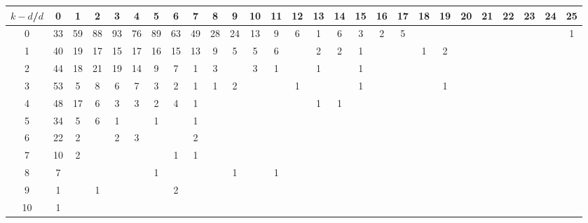 \documentclass{article}[12pt]
\begin{document}
\begin{landscape}

\begin{table}[h]\footnotesize
{\centering
\begin{tabular}{|c|c|
c|c|c|c|c|c|c|c|c|c|c|c|c|c|c|c|c|c|c|c|c|c|c|c|c|}
  \hline
  $k-d$/$d$ 
 & 0 & 1 & 2 & 3 & 4 & 5 & 6 & 7 & 8 & 9 & 10 & 11 & 12 & 13 & 14 & 15 & 16 & 17 & 18 & 19 & 20 & 21 & 22 & 23 & 24 & 25\\

  \hline
  \hline

0  & 33 & 59 & 88 & 93 & 76 & 89 & 63 & 49 & 28 & 24 & 13 & 9 & 6 & 1 & 6 & 3 & 2 & 5 &  &  &  &  &  &  &  & 1\\

1  & 40 & 19 & 17 & 15 & 17 & 16 & 15 & 13 & 9 & 5 & 5 & 6 &  & 2 & 2 & 1 &  &  & 1 & 2 &  &  &  &  &  & \\

2  & 44 & 18 & 21 & 19 & 14 & 9 & 7 & 1 & 3 &  & 3 & 1 &  & 1 &  & 1 &  &  &  &  &  &  &  &  &  & \\

3  & 53 & 5 & 8 & 6 & 7 & 3 & 2 & 1 & 1 & 2 &  &  & 1 &  &  & 1 &  &  &  & 1 &  &  &  &  &  & \\

4  & 48 & 17 & 6 & 3 & 3 & 2 & 4 & 1 &  &  &  &  &  & 1 & 1 &  &  &  &  &  &  &  &  &  &  & \\

5  & 34 & 5 & 6 & 1 &  & 1 &  & 1 &  &  &  &  &  &  &  &  &  &  &  &  &  &  &  &  &  & \\

6  & 22 & 2 &  & 2 & 3 &  &  & 2 &  &  &  &  &  &  &  &  &  &  &  &  &  &  &  &  &  & \\

7  & 10 & 2 &  &  &  &  & 1 & 1 &  &  &  &  &  &  &  &  &  &  &  &  &  &  &  &  &  & \\

8  & 7 &  &  &  &  & 1 &  &  &  & 1 &  & 1 &  &  &  &  &  &  &  &  &  &  &  &  &  & \\

9  & 1 &  & 1 &  &  &  & 2 &  &  &  &  &  &  &  &  &  &  &  &  &  &  &  &  &  &  & \\

10  & 1 &  &  &  &  &  &  &  &  &  &  &  &  &  &  &  &  &  &  &  &  &  &  &  &  & \\


\end{tabular}}
\end{table}
\end{landscape}
\end{document}
